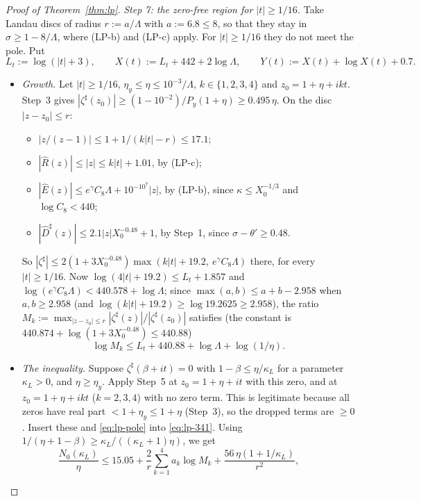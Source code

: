 \begin{proof}[Proof of Theorem~\ref{thm:lp}]
\emph{Step 7: the zero-free region for $|t|\ge1/16$.} Take Landau discs of radius $r:=a/\Lambda$ with $a:=6.8\le8$, so that
they stay in $\sigma\ge1-8/\Lambda$, where (LP-b) and (LP-c) apply. For $|t|\ge1/16$ they do not meet the pole. Put
\[
  L_t:=\log(|t|+3),\qquad X(t):=L_t+442+2\log\Lambda,\qquad Y(t):=X(t)+\log X(t)+0.7 .
\]
\begin{itemize}
\item \emph{Growth.} Let $|t|\ge1/16$, $\eta_y\le\eta\le10^{-3}/\Lambda$, $k\in\{1,2,3,4\}$ and $z_0=1+\eta+ikt$. Step~3 gives
  $|\zeta^\sharp(z_0)|\ge(1-10^{-2})/P_y(1+\eta)\ge0.495\,\eta$. On the disc $|z-z_0|\le r$:
  \begin{itemize}
  \item $|z/(z-1)|\le1+1/(k|t|-r)\le17.1$;
  \item $|\hat R(z)|\le|z|\le k|t|+1.01$, by (LP-c);
  \item $|\hat E(z)|\le e^\gamma C_8\Lambda+10^{-10^7}|z|$, by (LP-b), since $\kappa\le X_0^{-1/3}$ and $\log C_8<440$;
  \item $|\hat D^\sharp(z)|\le2.1|z|X_0^{-0.48}+1$, by Step~1, since $\sigma-\theta'\ge0.48$.
  \end{itemize}
  So $|\zeta^\sharp|\le2(1+3X_0^{-0.48})\max(k|t|+19.2,\ e^\gamma C_8\Lambda)$ there, for every $|t|\ge1/16$. Now
  $\log(4|t|+19.2)\le L_t+1.857$ and $\log(e^\gamma C_8\Lambda)<440.578+\log\Lambda$; since $\max(a,b)\le a+b-2.958$ when
  $a,b\ge2.958$ (and $\log(k|t|+19.2)\ge\log19.2625\ge2.958$), the ratio $M_k:=\max_{|z-z_0|\le r}|\zeta^\sharp(z)|/|\zeta^\sharp(z_0)|$ satisfies (the constant is
  $440.874+\log(1+3X_0^{-0.48})\le440.88$)
  \begin{equation}\label{eq:lp-growth}
    \log M_k\le L_t+440.88+\log\Lambda+\log(1/\eta).
  \end{equation}
\item \emph{The inequality.} Suppose $\zeta^\sharp(\beta+it)=0$ with $1-\beta\le\eta/\kappa_L$ for a parameter $\kappa_L>0$, and
  $\eta\ge\eta_y$. Apply Step~5 at $z_0=1+\eta+it$ with this zero, and at $z_0=1+\eta+ikt$ ($k=2,3,4$) with no zero term.
  This is legitimate because all zeros have real part $<1+\eta_y\le1+\eta$ (Step~3), so the dropped terms are $\ge0$. Insert
  these and \eqref{eq:lp-pole} into \eqref{eq:lp-341}. Using $1/(\eta+1-\beta)\ge\kappa_L/((\kappa_L+1)\eta)$, we get
  \[
    \frac{N_0(\kappa_L)}{\eta}\le15.05+\frac2r\sum_{k=1}^4a_k\log M_k+\frac{56\,\eta(1+1/\kappa_L)}{r^2},\qquad
\]
\end{itemize}
\end{proof}
